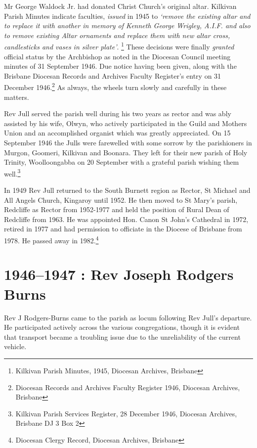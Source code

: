 Mr George Waldock Jr. had donated Christ Church's original altar. Kilkivan Parish Minutes indicate faculties, \emph{issued} in 1945 to \emph{`remove the existing altar and to replace it with another in memory of Kenneth George Wrigley, A.I.F. and also to remove existing Altar ornaments and replace them with new altar cross, candlesticks and vases in silver plate'}. \footnote{Kilkivan Parish Minutes, 1945, Diocesan Archives, Brisbane} These decisions were finally \emph{granted} official status by the Archbishop as noted in the Diocesan Council meeting minutes of 31 September 1946. Due notice having been given, along with the Brisbane Diocesan Records and Archives Faculty Register's entry on 31 December 1946.\footnote{Diocesan Records and Archives Faculty Register 1946, Diocesan Archives, Brisbane} As always, the wheels turn slowly and carefully in these matters.


Rev Jull served the parish well during his two years as rector and was ably assisted by his wife, Olwyn, who actively participated in the Guild and Mothers Union and an accomplished organist which was greatly appreciated. On 15 September 1946 the Julls were farewelled with some sorrow by the parishioners in Murgon, Goomeri, Kilkivan and Boonara. They left for their new parish of Holy Trinity, Woolloongabba on 20 September with a grateful parish wishing them well.\footnote{Kilkivan Parish Services Register, 28 December 1946, Diocesan Archives, Brisbane DJ 3 Box 2}


In 1949 Rev Jull returned to the South Burnett region as Rector, St Michael and All Angels Church, Kingaroy until 1952. He then moved to St Mary's parish, Redcliffe as Rector from 1952-1977 and held the position of Rural Dean of Redcliffe from 1963. He was appointed Hon. Canon St John's Cathedral in 1972, retired in 1977 and had permission to officiate in the Diocese of Brisbane from 1978. He passed away in 1982.\footnote{Diocesan Clergy Record, Diocesan Archives, Brisbane}


\section{1946--1947 : Rev Joseph Rodgers Burns}



Rev J Rodgers-Burns came to the parish as locum following Rev Jull's departure. He participated actively across the various congregations, though it is evident that transport became a troubling issue due to the unreliability of the current vehicle.




